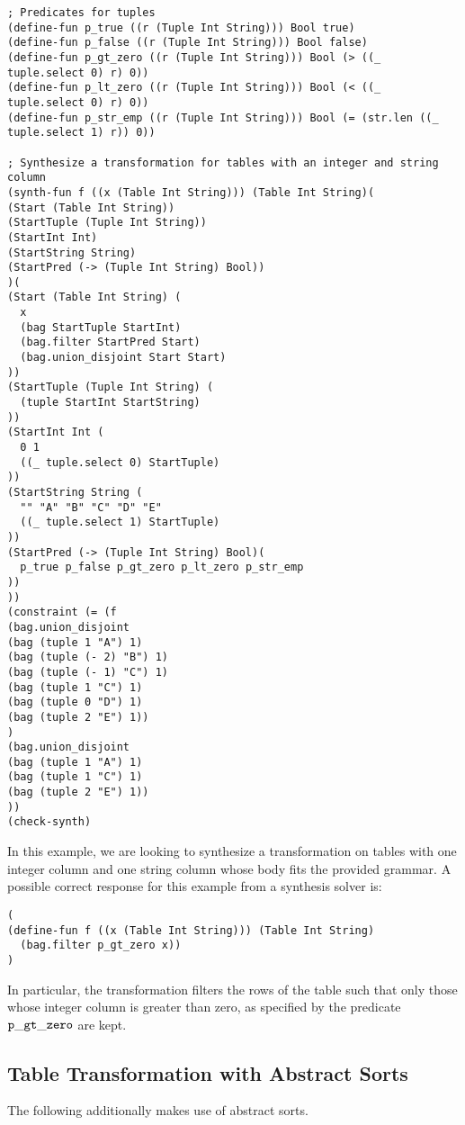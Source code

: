 \documentclass[english,a4paper,10pt]{article}
\begin{document}
\begin{verbatim}
; Predicates for tuples
(define-fun p_true ((r (Tuple Int String))) Bool true)
(define-fun p_false ((r (Tuple Int String))) Bool false)
(define-fun p_gt_zero ((r (Tuple Int String))) Bool (> ((_ tuple.select 0) r) 0))
(define-fun p_lt_zero ((r (Tuple Int String))) Bool (< ((_ tuple.select 0) r) 0))
(define-fun p_str_emp ((r (Tuple Int String))) Bool (= (str.len ((_ tuple.select 1) r)) 0))

; Synthesize a transformation for tables with an integer and string column
(synth-fun f ((x (Table Int String))) (Table Int String)(
(Start (Table Int String))
(StartTuple (Tuple Int String))
(StartInt Int)
(StartString String)
(StartPred (-> (Tuple Int String) Bool))
)(
(Start (Table Int String) (
  x
  (bag StartTuple StartInt)
  (bag.filter StartPred Start)
  (bag.union_disjoint Start Start)
))
(StartTuple (Tuple Int String) (
  (tuple StartInt StartString)
))
(StartInt Int (
  0 1
  ((_ tuple.select 0) StartTuple)
))
(StartString String (
  "" "A" "B" "C" "D" "E" 
  ((_ tuple.select 1) StartTuple)
))
(StartPred (-> (Tuple Int String) Bool)(
  p_true p_false p_gt_zero p_lt_zero p_str_emp
))
))
(constraint (= (f 
(bag.union_disjoint
(bag (tuple 1 "A") 1)
(bag (tuple (- 2) "B") 1)
(bag (tuple (- 1) "C") 1)
(bag (tuple 1 "C") 1)
(bag (tuple 0 "D") 1)
(bag (tuple 2 "E") 1))
)
(bag.union_disjoint
(bag (tuple 1 "A") 1)
(bag (tuple 1 "C") 1)
(bag (tuple 2 "E") 1))
))
(check-synth)
\end{verbatim}
In this example, we are looking to synthesize a transformation on
tables with one integer column and one string column whose body
fits the provided grammar.
A possible correct response for this example from a synthesis solver is:
\begin{verbatim}
(
(define-fun f ((x (Table Int String))) (Table Int String)
  (bag.filter p_gt_zero x))
)
\end{verbatim}
In particular, the transformation filters the rows of the table such that
only those whose integer column is greater than zero, as specified by the
predicate ${\tt p\_gt\_zero}$ are kept.

\subsection{Table Transformation with Abstract Sorts}
The following additionally makes use of abstract sorts.
\end{document}
